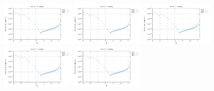 \noindent
\includegraphics[width=3.5cm]{python_codes/fieldstone_152/RESULTS/exp3/sr2_32_m2}
\includegraphics[width=3.5cm]{python_codes/fieldstone_152/RESULTS/exp3/sr2_32_m3}
\includegraphics[width=3.5cm]{python_codes/fieldstone_152/RESULTS/exp3/sr2_32_m4}
\includegraphics[width=3.5cm]{python_codes/fieldstone_152/RESULTS/exp3/sr2_32_m5}
\includegraphics[width=3.5cm]{python_codes/fieldstone_152/RESULTS/exp3/sr2_32_m6}


